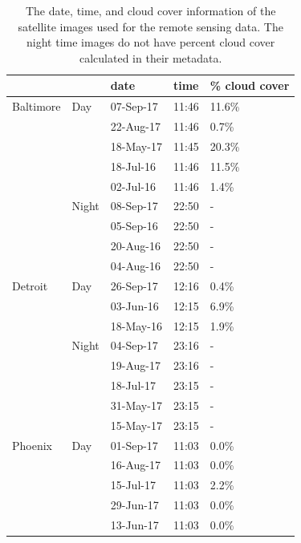 \documentclass[final,3p,times,onecolumn,sort&compress]{elsarticle}
\begin{document}
\begin{table}[H]
\caption{The date, time, and cloud cover information of the satellite images used for the remote sensing data. The night time images do not have percent cloud cover calculated in their metadata.}
\label{tab:satellite_meta}
\begin{tabular}{ll|lll}
          &       & date      & time  & \% cloud cover \\
          \hline
Baltimore & Day   & 07-Sep-17 & 11:46 & 11.6\%         \\
          &       & 22-Aug-17 & 11:46 & 0.7\%          \\
          &       & 18-May-17 & 11:45 & 20.3\%         \\
          &       & 18-Jul-16 & 11:46 & 11.5\%         \\
          &       & 02-Jul-16 & 11:46 & 1.4\%          \\
          & Night & 08-Sep-17 & 22:50 & -              \\
          &       & 05-Sep-16 & 22:50 & -              \\
          &       & 20-Aug-16 & 22:50 & -              \\
          &       & 04-Aug-16 & 22:50 & -              \\
Detroit   & Day   & 26-Sep-17 & 12:16 & 0.4\%          \\
          &       & 03-Jun-16 & 12:15 & 6.9\%          \\
          &       & 18-May-16 & 12:15 & 1.9\%          \\
          & Night & 04-Sep-17 & 23:16 & -              \\
          &       & 19-Aug-17 & 23:16 & -              \\
          &       & 18-Jul-17 & 23:15 & -              \\
          &       & 31-May-17 & 23:15 & -              \\
          &       & 15-May-17 & 23:15 & -              \\
Phoenix   & Day   & 01-Sep-17 & 11:03 & 0.0\%          \\
          &       & 16-Aug-17 & 11:03 & 0.0\%          \\
          &       & 15-Jul-17 & 11:03 & 2.2\%          \\
          &       & 29-Jun-17 & 11:03 & 0.0\%          \\
          &       & 13-Jun-17 & 11:03 & 0.0\%          \\

\end{tabular}
\end{table}
\end{document}
